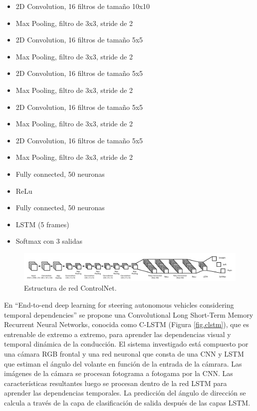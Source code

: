 \begin{itemize}
    \item 2D Convolution, 16 filtros de tamaño 10x10
    \item Max Pooling, filtro de 3x3, stride de 2
    \item 2D Convolution, 16 filtros de tamaño 5x5
    \item Max Pooling, filtro de 3x3, stride de 2
    \item 2D Convolution, 16 filtros de tamaño 5x5
    \item Max Pooling, filtro de 3x3, stride de 2
    \item 2D Convolution, 16 filtros de tamaño 5x5
    \item Max Pooling, filtro de 3x3, stride de 2
    \item 2D Convolution, 16 filtros de tamaño 5x5
    \item Max Pooling, filtro de 3x3, stride de 2
    \item Fully connected, 50 neuronas
    \item ReLu
    \item Fully connected, 50 neuronas
    \item LSTM (5 frames)
    \item Softmax con 3 salidas
\end{itemize}

\begin{figure}
\begin{center}
	\includegraphics[width=1\textwidth]{figures/Estado_arte/controlnet.png}
   \caption{Estructura de red ControlNet.}
	\label{fig.controlnet}
\end{center}
\end{figure}

En ``End-to-end deep learning for steering autonomous vehicles considering temporal dependencies'' \cite{temporal-dependencies} se propone una Convolutional Long Short-Term Memory Recurrent Neural Networks, conocida como C-LSTM (Figura \ref{fig.clstm}), que es entrenable de extremo a extremo, para aprender las dependencias visual y temporal dinámica de la conducción. El sistema investigado está compuesto por una cámara RGB frontal y una red neuronal que consta de una CNN y LSTM que estiman el ángulo del volante en función de la entrada de la cámrara. Las imágenes de la cámara se procesan fotograma a fotogama por la CNN. Las características resultantes luego se procesan dentro de la red LSTM para aprender las dependencias temporales. La predicción del ángulo de dirección se calcula a través de la capa de clasificación de salida después de las capas LSTM.\\

